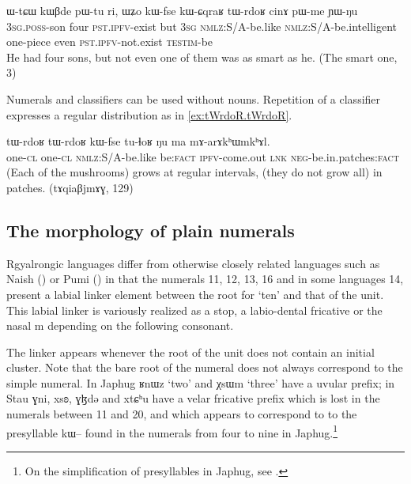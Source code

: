 \documentclass[oldfontcommands,oneside,a4paper,12pt]{article}
\newcommand{\ipa}[1]{{\phon#1}}
\begin{document}
\begin{exe}
\ex \label{ex:tWrdoR.cinA}
\gll 
\ipa{ɯ-tɕɯ} 	\ipa{kɯβde} 	\ipa{pɯ-tu} 	\ipa{ri,} 	\ipa{ɯʑo} 	\ipa{kɯ-fse} 	\ipa{kɯ-ɕqraʁ} 	\ipa{tɯ-rdoʁ} 	\ipa{cinɤ} 	\ipa{pɯ-me} 	\ipa{ɲɯ-ŋu} 	\\
\textsc{3sg.poss}-son four \textsc{pst.ipfv}-exist but \textsc{3sg} \textsc{nmlz}:S/A-be.like \textsc{nmlz}:S/A-be.intelligent one-piece even \textsc{pst.ipfv}-not.exist \textsc{testim}-be \\
\glt He had four sons, but not even one of them was as smart as he. (The smart one, 3)
\end{exe} 
 
 Numerals and classifiers can be used without nouns. Repetition of a classifier  expresses a regular distribution as in \ref{ex:tWrdoR.tWrdoR}.
 \begin{exe}
\ex \label{ex:tWrdoR.tWrdoR}
\gll 
 \ipa{tɯ-rdoʁ} 	\ipa{tɯ-rdoʁ} 	\ipa{kɯ-fse} 	\ipa{tu-ɬoʁ} 	\ipa{ŋu} 	\ipa{ma} 	\ipa{mɤ-arɤkʰɯmkʰɤl.}  \\
  one-\textsc{cl}  one-\textsc{cl} \textsc{nmlz}:S/A-be.like  be:\textsc{fact} \textsc{ipfv}-come.out \textsc{lnk} \textsc{neg}-be.in.patches:\textsc{fact} \\
 \glt (Each of the mushrooms) grows at regular intervals, (they do not grow all) in patches. (\ipa{tɤqiaβjmɤɣ}, 129)
\end{exe}
 
 \subsection{The morphology of plain numerals}
 
 Rgyalrongic languages differ from otherwise closely related languages such as Naish (\citealt{michaud11cl}) or Pumi (\citealt[141]{daudey14grammar}) in that the numerals 11, 12, 13, 16  and in some languages 14, present a labial linker element between the root for `ten' and that of the unit.  
 This labial linker  is variously realized as a stop, a labio-dental fricative or the nasal \ipa{m} depending on the following consonant.
 
 The linker appears whenever  the root of the unit does not contain an initial cluster. Note that the bare root of the numeral does not always correspond to the simple numeral. In Japhug \ipa{ʁnɯz}  `two' and 	\ipa{χsɯm} `three'  have a uvular prefix; in Stau \ipa{ɣni}, \ipa{xsʚ}, \ipa{ɣɮdə} and 	\ipa{xtɕʰu}   have a velar fricative prefix which is lost in the numerals between 11 and 20, and which appears to correspond  to  to the presyllable \ipa{kɯ--} found in the numerals from four to nine in Japhug.\footnote{On the simplification of presyllables in Japhug, see \citet{jacques14antipassive}.}
 
\end{document}
